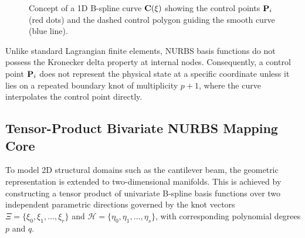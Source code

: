\begin{figure}[htbp]
    \centering
    \caption{Concept of a 1D B-spline curve $\mathbf{C}(\xi)$ showing the control points $\mathbf{P}_i$ (red dots) and the dashed control polygon guiding the smooth curve (blue line).}
    \label{fig:bspline_curve_concept}
\end{figure}

Unlike standard Lagrangian finite elements, NURBS basis functions do not possess the Kronecker delta property at internal nodes. Consequently, a control point $\mathbf{P}_i$ does not represent the physical state at a specific coordinate unless it lies on a repeated boundary knot of multiplicity $p+1$, where the curve interpolates the control point directly.

\subsection{Tensor-Product Bivariate NURBS Mapping Core}
To model 2D structural domains such as the cantilever beam, the geometric representation is extended to two-dimensional manifolds. This is achieved by constructing a tensor product of univariate B-spline basis functions over two independent parametric directions governed by the knot vectors $\Xi = \{\xi_0, \xi_1, \dots, \xi_{r}\}$ and $\mathcal{H} = \{\eta_0, \eta_1, \dots, \eta_{s}\}$, with corresponding polynomial degrees $p$ and $q$.

